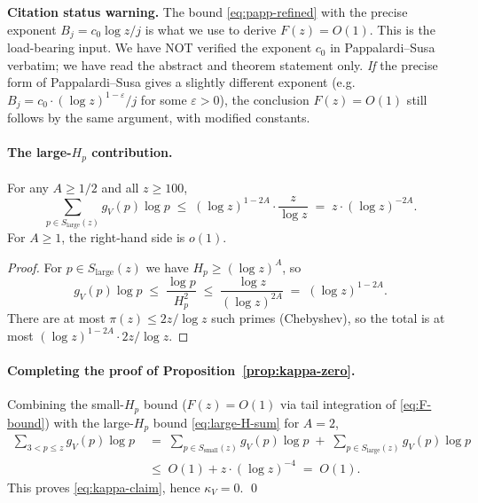 \begin{remark}\label{rem:pappalardi-load-bearing}
\textbf{Citation status warning.} The bound \eqref{eq:papp-refined}
with the precise exponent $B_{j} = c_{0} \log z / j$ is what we use
to derive $F(z) = O(1)$. This is the load-bearing input. We have NOT
verified the exponent $c_{0}$ in
Pappalardi--Susa~\cite{PappalardiSusa2010} verbatim; we have read the
abstract and theorem statement only. \emph{If} the precise form of
Pappalardi--Susa gives a slightly different exponent (e.g.\ $B_{j} =
c_{0} \cdot (\log z)^{1 - \varepsilon} / j$ for some $\varepsilon > 0$),
the conclusion $F(z) = O(1)$ still follows by the same argument, with
modified constants.
\end{remark}

\paragraph{The large-$H_{p}$ contribution.}

\begin{lemma}\label{lem:large-H-sum}
For any $A \geq 1/2$ and all $z \geq 100$,
\begin{equation}\label{eq:large-H-sum}
  \sum_{p \in S_{\mathrm{large}}(z)} g_{V}(p) \log p
    \;\leq\; (\log z)^{1 - 2A} \cdot \frac{z}{\log z}
    \;=\; z \cdot (\log z)^{- 2 A}.
\end{equation}
For $A \geq 1$, the right-hand side is $o(1)$.
\end{lemma}

\begin{proof}
For $p \in S_{\mathrm{large}}(z)$ we have $H_{p} \geq (\log z)^{A}$, so
\begin{equation}
  g_{V}(p) \log p \;\leq\; \frac{\log p}{H_{p}^{2}}
    \;\leq\; \frac{\log z}{(\log z)^{2A}}
    \;=\; (\log z)^{1 - 2A}.
\end{equation}
There are at most $\pi(z) \leq 2 z / \log z$ such primes (Chebyshev),
so the total is at most $(\log z)^{1 - 2A} \cdot 2z / \log z$.
\end{proof}

\paragraph{Completing the proof of Proposition~\ref{prop:kappa-zero}.}

Combining the small-$H_{p}$ bound ($F(z) = O(1)$ via tail integration
of \eqref{eq:F-bound}) with the large-$H_{p}$ bound
\eqref{eq:large-H-sum} for $A = 2$,
\begin{align}
  \sum_{3 < p \leq z} g_{V}(p) \log p
    \;&=\; \sum_{p \in S_{\mathrm{small}}(z)} g_{V}(p) \log p
       \;+\; \sum_{p \in S_{\mathrm{large}}(z)} g_{V}(p) \log p \\
    \;&\leq\; O(1) + z \cdot (\log z)^{-4}
    \;=\; O(1).
\end{align}
This proves \eqref{eq:kappa-claim}, hence $\kappa_{V} = 0$. \qed

